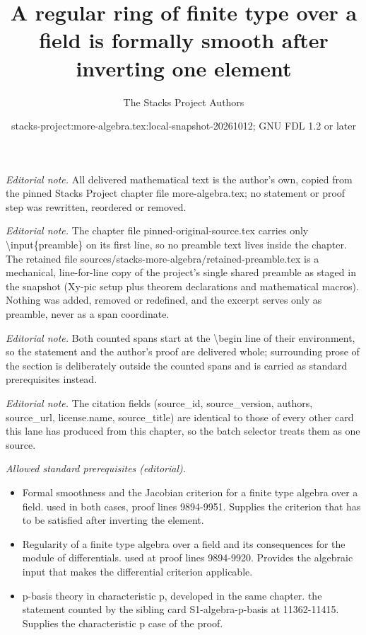 \documentclass[10pt,a4paper]{amsart}
\title{A regular ring of finite type over a field is formally smooth after inverting one element}
\author{The Stacks Project Authors}
\date{stacks-project:more-algebra.tex:local-snapshot-20261012; GNU FDL 1.2 or later}
\theoremstyle{plain}
\theoremstyle{definition}
\theoremstyle{remark}
\numberwithin{equation}{subsection}
\begin{document}
\maketitle
\setcounter{subsection}{1}
\noindent\textit{Editorial note.} All delivered mathematical text is the author's own, copied from the pinned Stacks Project chapter file more-algebra.tex; no statement or proof step was rewritten, reordered or removed.\par\medskip
\noindent\textit{Editorial note.} The chapter file pinned-original-source.tex carries only \textbackslash{}input\{preamble\} on its first line, so no preamble text lives inside the chapter. The retained file sources/stacks-more-algebra/retained-preamble.tex is a mechanical, line-for-line copy of the project's single shared preamble as staged in the snapshot (Xy-pic setup plus theorem declarations and mathematical macros). Nothing was added, removed or redefined, and the excerpt serves only as preamble, never as a span coordinate.\par\medskip
\noindent\textit{Editorial note.} Both counted spans start at the \textbackslash{}begin line of their environment, so the statement and the author's proof are delivered whole; surrounding prose of the section is deliberately outside the counted spans and is carried as standard prerequisites instead.\par\medskip
\noindent\textit{Editorial note.} The citation fields (source\_id, source\_version, authors, source\_url, license.name, source\_title) are identical to those of every other card this lane has produced from this chapter, so the batch selector treats them as one source.\par\medskip
\noindent\textit{Allowed standard prerequisites (editorial).}\begin{itemize}
\item Formal smoothness and the Jacobian criterion for a finite type algebra over a field. used in both cases, proof lines 9894-9951. Supplies the criterion that has to be satisfied after inverting the element.
\item Regularity of a finite type algebra over a field and its consequences for the module of differentials. used at proof lines 9894-9920. Provides the algebraic input that makes the differential criterion applicable.
\item p-basis theory in characteristic p, developed in the same chapter. the statement counted by the sibling card S1-algebra-p-basis at 11362-11415. Supplies the characteristic p case of the proof.
\end{itemize}\medskip
\end{document}

